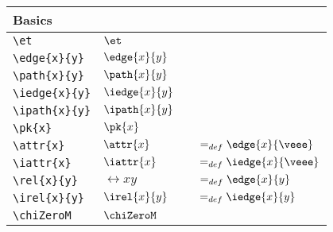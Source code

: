\documentclass[10pt,a4paper]{article}
\begin{document}
\begin{tabular}{l l p{0.5cm} l }
Basics \\
\hline
\verb'\et'          & $\et$ \\
\verb'\edge{x}{y}'  & $\edge{x}{y}$ \\
\verb'\path{x}{y}'  & $\path{x}{y}$ \\
\verb'\iedge{x}{y}' & $\iedge{x}{y}$ \\
\verb'\ipath{x}{y}' & $\ipath{x}{y}$ \\
\verb'\pk{x}'       & $\pk{x} $      \\
\verb'\attr{x}'     & $\attr{x} $  &       & $=_{def} \edge{x}{\veee}$ \\
\verb'\iattr{x}'    & $\iattr{x} $ &       & $=_{def} \iedge{x}{\veee}$ \\
\verb'\rel{x}{y}'   & $\rel{x}{y}$  &      & $=_{def} \edge{x}{y}$ \\
\verb'\irel{x}{y}'  & $\irel{x}{y}$ &      & $=_{def} \iedge{x}{y}$ \\
\verb'\chiZeroM'    & $\chiZeroM  $ &      &                        \\
\end{tabular}
\end{document}

